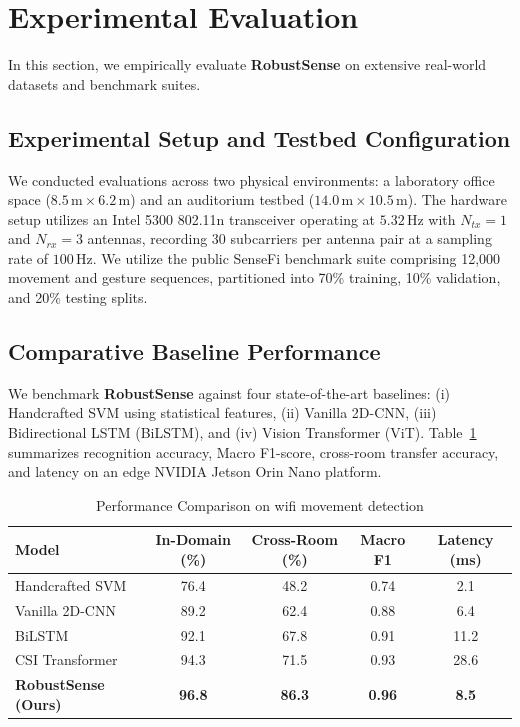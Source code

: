 \section{Experimental Evaluation}
\label{sec:experiments}
In this section, we empirically evaluate \textbf{RobustSense} on extensive real-world datasets and benchmark suites.

\subsection{Experimental Setup and Testbed Configuration}
We conducted evaluations across two physical environments: a laboratory office space ($8.5\,\text{m} \times 6.2\,\text{m}$) and an auditorium testbed ($14.0\,\text{m} \times 10.5\,\text{m}$). The hardware setup utilizes an Intel 5300 802.11n transceiver operating at $5.32\,\text{Hz}$ with $N_{tx}=1$ and $N_{rx}=3$ antennas, recording 30 subcarriers per antenna pair at a sampling rate of $100\,\text{Hz}$. We utilize the public SenseFi benchmark suite \cite{yang2022sensefi} comprising 12,000 movement and gesture sequences, partitioned into 70\% training, 10\% validation, and 20\% testing splits.

\subsection{Comparative Baseline Performance}
We benchmark \textbf{RobustSense} against four state-of-the-art baselines: (i) Handcrafted SVM using statistical features, (ii) Vanilla 2D-CNN, (iii) Bidirectional LSTM (BiLSTM), and (iv) Vision Transformer (ViT). Table~\ref{tab:results} summarizes recognition accuracy, Macro F1-score, cross-room transfer accuracy, and latency on an edge NVIDIA Jetson Orin Nano platform.

\begin{table}[h]
\caption{Performance Comparison on wifi movement detection}
\label{tab:results}
\centering
\begin{tabular}{lcccc}
\hline
\textbf{Model} & \textbf{In-Domain (\%)} & \textbf{Cross-Room (\%)} & \textbf{Macro F1} & \textbf{Latency (ms)} \\
\hline
Handcrafted SVM & 76.4 & 48.2 & 0.74 & 2.1 \\
Vanilla 2D-CNN & 89.2 & 62.4 & 0.88 & 6.4 \\
BiLSTM \cite{yang2022sensefi} & 92.1 & 67.8 & 0.91 & 11.2 \\
CSI Transformer & 94.3 & 71.5 & 0.93 & 28.6 \\
\textbf{RobustSense (Ours)} & \textbf{96.8} & \textbf{86.3} & \textbf{0.96} & \textbf{8.5} \\
\hline
\end{tabular}
\end{table}

